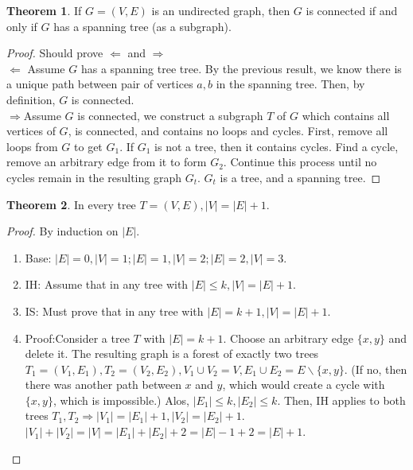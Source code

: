 \documentclass[letter]{book}
\theoremstyle{definition}
\newtheorem{theorem}{Theorem}[chapter]
\theoremstyle{definition}
\theoremstyle{remark}
\begin{document}
\begin{theorem}
    If $G=(V,E)$ is an undirected graph, then $G$ is connected if and only if $G$ has a spanning tree (as a subgraph).
    \begin{proof}
        Should prove $\Leftarrow$ and $\Rightarrow$\\
        $\Leftarrow$ Assume $G$ has a spanning tree tree. By the previous result, we know there is a unique path between pair of vertices $a,b$ in the spanning tree. Then, by definition, $G$ is connected.\\
        $\Rightarrow$Assume $G$ is connected, we construct a subgraph $T$ of $G$ which contains all vertices of $G$, is connected, and contains no loops and cycles. First, remove all loops from $G$ to get $G_1$. If $G_1$ is not a tree, then it contains cycles. Find a cycle, remove an arbitrary edge from it to form $G_2$. Continue this process until no cycles remain in the resulting graph $G_t$. $G_t$ is a tree, and a spanning tree.
    \end{proof}
\end{theorem}
\bigskip
\begin{theorem}
    In every tree $T=(V,E), |V|=|E|+1$.
    \begin{proof}By induction on $|E|$.\\
        \begin{enumerate}
            \item Base: $|E|=0, |V|=1; |E|=1,|V|=2;|E|=2,|V|=3$.
            \item IH: Assume that in any tree with $|E|\leq k, |V|=|E|+1$.
            \item IS: Must prove that in any tree with $|E|=k+1,|V|=|E|+1$.
            \item Proof:Consider a tree $T$ with $|E|=k+1$. Choose an arbitrary edge $\{x,y\}$ and delete it. The resulting graph is a forest of exactly two trees $T_1=(V_1,E_1),T_2=(V_2,E_2),V_1\cup V_2=V,E_1\cup E_2=E\backslash\{x,y\}$. (If no, then there was another path between $x$ and $y$, which would create a cycle with $\{x,y\}$, which is impossible.) Alos, $|E_1|\leq k, |E_2|\leq k$. Then, IH applies to both trees $T_1,T_2\Rightarrow |V_1|=|E_1|+1,|V_2|=|E_2|+1$. $|V_1|+|V_2|=|V|=|E_1|+|E_2|+2=|E|-1+2=|E|+1$.
        \end{enumerate}
    \end{proof}
\end{theorem}
\bigskip
\end{document}
